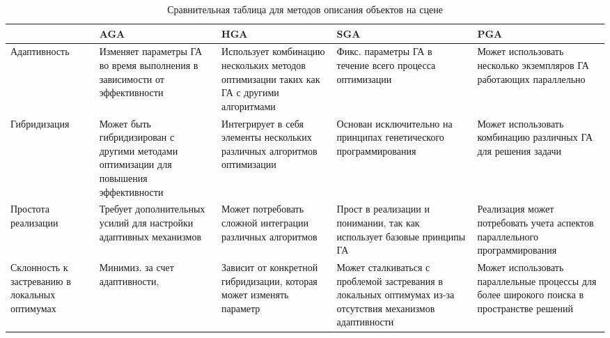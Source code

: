 \begin{table}[h!]
	\begin{center}
		\caption{\label{table:models} Сравнительная таблица для методов описания объектов на сцене}
		\begin{tabular}{|p{85pt}|p{85pt}|p{85pt}|p{85pt}|p{85pt}|}
			\hline
			~ & \textbf{AGA} & \textbf{HGA} & \textbf{SGA} & \textbf{PGA} \\
			\hline
			Адаптивность & Изменяет параметры ГА во время выполнения в зависимости от эффективности & Использует комбинацию нескольких методов оптимизации таких как ГА с другими алгоритмами & Фикс. параметры ГА в течение всего процесса оптимизации & Может использовать несколько экземпляров ГА работающих параллельно \\ \hline
			Гибридизация & Может быть гибридизирован с другими методами оптимизации для повышения эффективности & Интегрирует в себя элементы нескольких различных алгоритмов оптимизации & Основан исключительно на принципах генетического программирования & Может использовать комбинацию различных ГА для решения задачи \\ \hline
			Простота реализации & Требует дополнительных усилий для настройки адаптивных механизмов & Может потребовать сложной интеграции различных алгоритмов & Прост в реализации и понимании, так как использует базовые принципы ГА & Реализация может потребовать учета аспектов параллельного программирования \\ \hline
			Склонность к застреванию в локальных оптимумах & Минимиз. за счет адаптивности, & Зависит от конкретной гибридизации, которая может изменять параметр & Может сталкиваться с проблемой застревания в локальных оптимумах из-за отсутствия механизмов адаптивности & Может использовать параллельные  процессы для более широкого поиска в пространстве решений \\  \hline
		\end{tabular}
	\end{center}
\end{table}



